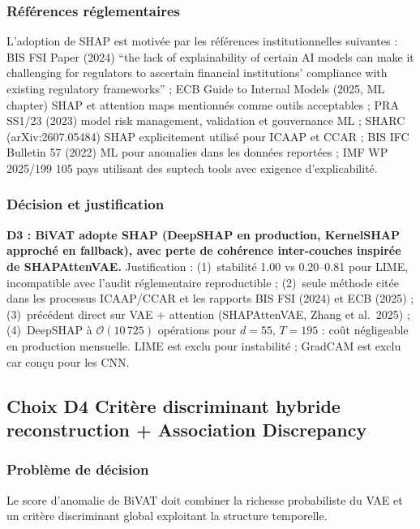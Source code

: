 \documentclass[12pt,a4paper]{article}
\begin{document}
\subsubsection{Références réglementaires}

L'adoption de SHAP est motivée par les références institutionnelles suivantes :
BIS FSI Paper (2024)  ``the lack of explainability of certain AI models can
make it challenging for regulators to ascertain financial institutions' compliance
with existing regulatory frameworks'' ; ECB Guide to Internal Models (2025,
ML chapter)  SHAP et attention maps mentionnés comme outils acceptables ;
PRA SS1/23 (2023)  model risk management, validation et gouvernance ML ;
SHARC (arXiv:2607.05484)  SHAP explicitement utilisé pour ICAAP et CCAR ;
BIS IFC Bulletin 57 (2022)  ML pour anomalies dans les données reportées ;
IMF WP 2025/199  105 pays utilisant des suptech tools avec exigence
d'explicabilité.

\subsubsection{Décision et justification}

\textbf{D3 : BiVAT adopte SHAP (DeepSHAP en production, KernelSHAP approché
en fallback), avec perte de cohérence inter-couches inspirée de SHAPAttenVAE.}
Justification : (1)~stabilité 1.00 vs 0.20--0.81 pour LIME, incompatible avec
l'audit réglementaire reproductible ; (2)~seule méthode citée dans les processus
ICAAP/CCAR et les rapports BIS FSI (2024) et ECB (2025) ; (3)~précédent direct
sur VAE + attention (SHAPAttenVAE, Zhang et al.\ 2025) ; (4)~DeepSHAP à
$\mathcal{O}(10\,725)$ opérations pour $d=55$, $T=195$ : coût négligeable en
production mensuelle. LIME est exclu pour instabilité ; GradCAM est exclu car
conçu pour les CNN.

\subsection{Choix D4  Critère discriminant hybride reconstruction +
Association Discrepancy}

\subsubsection{Problème de décision}

Le score d'anomalie de BiVAT doit combiner la richesse probabiliste du VAE et
un critère discriminant global exploitant la structure temporelle.
\end{document}
